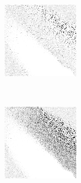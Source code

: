 \begin{figure}
\begin{subfigure}[t]{0.22\textwidth}
		\caption{\handmaxavg}
	\end{subfigure}
~
	\begin{subfigure}[t]{0.22\textwidth}
		\center
		\includegraphics[width=\textwidth]{images/findings/experiments/regularization/strats/0.70/hand_max_med.png}
		\caption{\handmaxmed}
	\end{subfigure}
	~
	\begin{subfigure}[t]{0.22\textwidth}
		\center
		\includegraphics[width=\textwidth]{images/findings/experiments/regularization/strats/0.70/hand_max_poss.png}
		\caption{\handmaxposs}
	\end{subfigure}


\end{figure}
